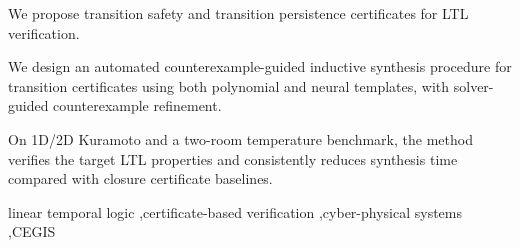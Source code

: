 ﻿\documentclass[a4paper,fleqn]{cas-sc}
\theoremstyle{definition}
\begin{document}
\begin{highlights}
\item We propose transition safety and transition persistence certificates for LTL verification.
\item We design an automated counterexample-guided inductive synthesis procedure for transition certificates using both polynomial and neural templates, with solver-guided counterexample refinement.
\item On 1D/2D Kuramoto and a two-room temperature benchmark, the method verifies the target LTL properties and consistently reduces synthesis time compared with closure certificate baselines.
\end{highlights}

\begin{keywords}
linear temporal logic \sep certificate-based verification \sep cyber-physical systems \sep CEGIS
\end{keywords}

\maketitle











\appendix

\end{document}
